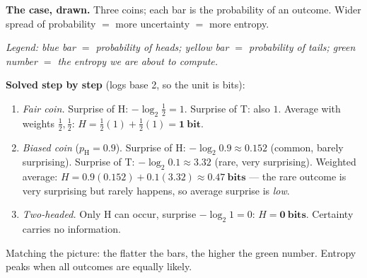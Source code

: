 \documentclass[11pt,a4paper]{article}
\begin{document}
\begin{worked}
\textbf{The case, drawn.} Three coins; each bar is the probability of an
outcome. Wider spread of probability $=$ more uncertainty $=$ more entropy.

\begin{center}

{\scriptsize\emph{Legend: blue bar $=$ probability of heads; yellow bar $=$
probability of tails; green number $=$ the entropy we are about to compute.}}
\end{center}

\textbf{Solved step by step} (logs base 2, so the unit is bits):
\begin{enumerate}[leftmargin=6mm, itemsep=0mm]
\item \emph{Fair coin.} Surprise of H: $-\log_2 \tfrac12 = 1$. Surprise of T:
also $1$. Average with weights $\tfrac12,\tfrac12$:
$H = \tfrac12(1) + \tfrac12(1) = \mathbf{1\ bit}$.
\item \emph{Biased coin} ($p_\text{H}{=}0.9$). Surprise of H:
$-\log_2 0.9 \approx 0.152$ (common, barely surprising). Surprise of T:
$-\log_2 0.1 \approx 3.32$ (rare, very surprising). Weighted average:
$H = 0.9(0.152) + 0.1(3.32) \approx \mathbf{0.47\ bits}$ --- the rare outcome
is very surprising but rarely happens, so average surprise is \emph{low}.
\item \emph{Two-headed.} Only H can occur, surprise $-\log_2 1 = 0$:
$H = \mathbf{0\ bits}$. Certainty carries no information.
\end{enumerate}
Matching the picture: the flatter the bars, the higher the green number.
Entropy peaks when all outcomes are equally likely.
\end{worked}
\end{document}
